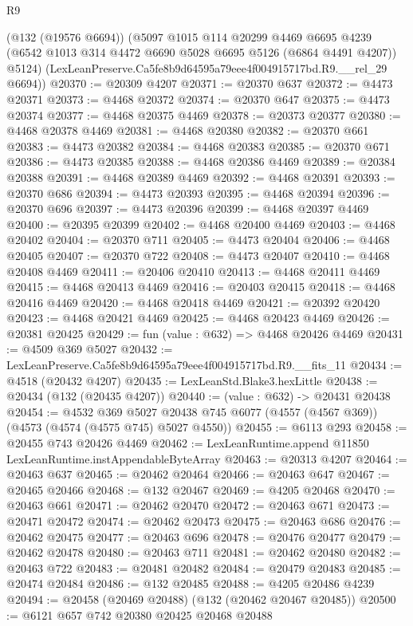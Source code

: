 \begin{lexlean}{R9}
\begin{coremodule}
      (@132 (@19576 @6694))
      (@5097
        @1015
        @114
        @20299
        @4469
        @6695
        @4239
        (@6542 @1013 @314 @4472 @6690 @5028 @6695 @5126 (@6864 @4491 @4207))
        @5124)
      (LexLeanPreserve.Ca5fe8b9d64595a79eee4f004915717bd.R9.__rel_29 @6694))
@20370 := @20309 @4207
@20371 := @20370 @637
@20372 := @4473 @20371
@20373 := @4468 @20372
@20374 := @20370 @647
@20375 := @4473 @20374
@20377 := @4468 @20375 @4469
@20378 := @20373 @20377
@20380 := @4468 @20378 @4469
@20381 := @4468 @20380
@20382 := @20370 @661
@20383 := @4473 @20382
@20384 := @4468 @20383
@20385 := @20370 @671
@20386 := @4473 @20385
@20388 := @4468 @20386 @4469
@20389 := @20384 @20388
@20391 := @4468 @20389 @4469
@20392 := @4468 @20391
@20393 := @20370 @686
@20394 := @4473 @20393
@20395 := @4468 @20394
@20396 := @20370 @696
@20397 := @4473 @20396
@20399 := @4468 @20397 @4469
@20400 := @20395 @20399
@20402 := @4468 @20400 @4469
@20403 := @4468 @20402
@20404 := @20370 @711
@20405 := @4473 @20404
@20406 := @4468 @20405
@20407 := @20370 @722
@20408 := @4473 @20407
@20410 := @4468 @20408 @4469
@20411 := @20406 @20410
@20413 := @4468 @20411 @4469
@20415 := @4468 @20413 @4469
@20416 := @20403 @20415
@20418 := @4468 @20416 @4469
@20420 := @4468 @20418 @4469
@20421 := @20392 @20420
@20423 := @4468 @20421 @4469
@20425 := @4468 @20423 @4469
@20426 := @20381 @20425
@20429 := fun (value : @632) => @4468 @20426 @4469
@20431 := @4509 @369 @5027
@20432 := LexLeanPreserve.Ca5fe8b9d64595a79eee4f004915717bd.R9.__fits_11
@20434 := @4518 (@20432 @4207)
@20435 := LexLeanStd.Blake3.hexLittle
@20438 := @20434 (@132 (@20435 @4207))
@20440 := (value : @632) -> @20431 @20438
@20454 := @4532
    @369
    @5027
    @20438
    @745
    @6077
    (@4557 (@4567 @369))
    (@4573 (@4574 (@4575 @745) @5027 @4550))
@20455 := @6113 @293
@20458 := @20455 @743 @20426 @4469
@20462 := LexLeanRuntime.append @11850 LexLeanRuntime.instAppendableByteArray
@20463 := @20313 @4207
@20464 := @20463 @637
@20465 := @20462 @20464
@20466 := @20463 @647
@20467 := @20465 @20466
@20468 := @132 @20467
@20469 := @4205 @20468
@20470 := @20463 @661
@20471 := @20462 @20470
@20472 := @20463 @671
@20473 := @20471 @20472
@20474 := @20462 @20473
@20475 := @20463 @686
@20476 := @20462 @20475
@20477 := @20463 @696
@20478 := @20476 @20477
@20479 := @20462 @20478
@20480 := @20463 @711
@20481 := @20462 @20480
@20482 := @20463 @722
@20483 := @20481 @20482
@20484 := @20479 @20483
@20485 := @20474 @20484
@20486 := @132 @20485
@20488 := @4205 @20486 @4239
@20494 := @20458 (@20469 @20488) (@132 (@20462 @20467 @20485))
@20500 := @6121 @657 @742 @20380 @20425 @20468 @20488

\end{coremodule}
\end{lexlean}
